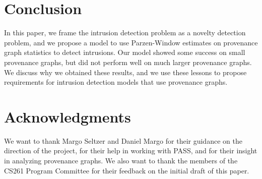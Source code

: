 \documentclass[10pt,twocolumn]{article}
\begin{document}
\section{Conclusion}

In this paper, we frame the intrusion detection problem as a novelty detection problem, and we propose a model to use Parzen-Window estimates on provenance graph statistics to detect intrusions. Our model showed some success on small provenance graphs, but did not perform well on much larger provenance graphs. We discuss why we obtained these results, and we use these lessons to propose requirements for intrusion detection models that use provenance graphs.

%

\section{Acknowledgments}
We want to thank Margo Seltzer and Daniel Margo for their guidance on the direction of the project, for their help in working with PASS, and for their insight in analyzing provenance graphs. We also want to thank the members of the CS261 Program Committee for their feedback on the initial draft of this paper.


%
\end{document}
